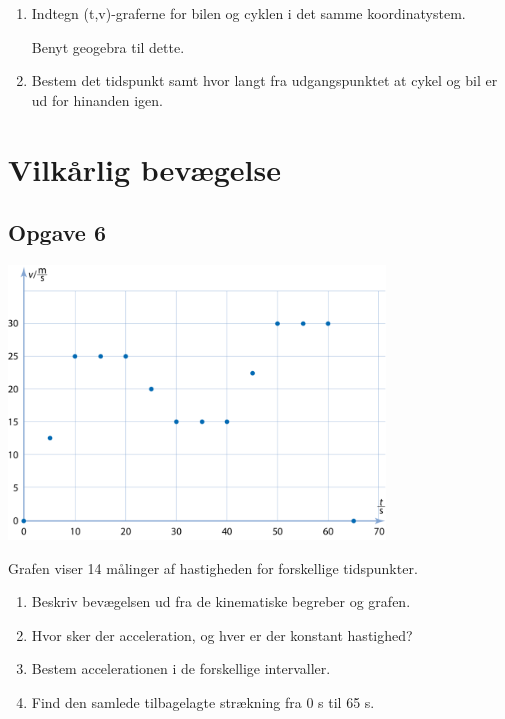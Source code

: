 \documentclass[a4paper, 12pt]{article}
\begin{document}
\begin{enumerate}
\item Indtegn (t,v)-graferne for bilen og cyklen i det samme koordinatystem.

Benyt geogebra til dette.

\item Bestem det tidspunkt samt hvor langt fra udgangspunktet at cykel og bil er ud for hinanden igen.
\end{enumerate}

\section*{Vilkårlig bevægelse}
\label{sec:org0a95869}

\subsection*{Opgave 6}
\label{sec:org798fe1d}

\begin{center}
\includegraphics[width=10cm]{img/2019-11-05_08-08-27_csm_76_Maalte_hastigheder_01_5964e15f5a.png}
\end{center}

Grafen viser 14 målinger af hastigheden for forskellige tidspunkter.

\begin{enumerate}
\item Beskriv bevægelsen ud fra de kinematiske begreber og grafen.
\item Hvor sker der acceleration, og hver er der konstant hastighed?
\item Bestem accelerationen i de forskellige intervaller.
\item Find den samlede tilbagelagte strækning fra 0 s til 65 s.
\end{enumerate}
\end{document}
